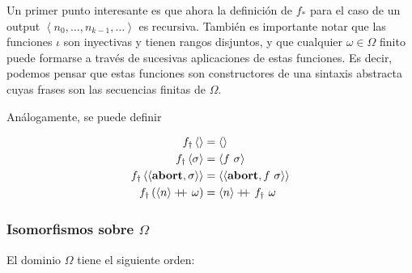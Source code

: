 \documentclass[a4paper, 12pt]{article}
\newcommand\doubleplus{+\kern-1.3ex+\kern0.8ex}
\begin{document}
Un primer punto interesante es que ahora la definición de $f_*$ para el caso de un
output $\left<n_0, \ldots, n_{k-1}, \ldots\right>$ es recursiva. También es
importante notar que las funciones $\iota$ son inyectivas y tienen rangos
disjuntos, y que cualquier $\omega \in \Omega$ finito puede formarse a través de
sucesivas aplicaciones de estas funciones. Es decir, podemos pensar que estas
funciones son constructores de una sintaxis abstracta cuyas frases son las
secuencias finitas de $\Omega$.

Análogamente, se puede definir 

\begin{align*}
  f_\dagger\left< \right> &= \left< \right> \\ 
  f_\dagger \left<\sigma \right> &= \left<f ~ \sigma \right> \\ 
  f_\dagger \left<\left<\textbf{abort}, \sigma \right> \right> &=
  \left<\left<\textbf{abort}, f ~\sigma \right> \right> \\ 
  f_\dagger \left( \left<n \right> \doubleplus \omega \right) &= \left<n \right>
  \doubleplus f_\dagger ~ \omega
\end{align*}
\pagebreak
\subsubsection{Isomorfismos sobre $\Omega$}

El dominio $\Omega$ tiene el siguiente orden:

~
\begin{figure}[!h]
\centering
{}
\end{figure} 
 
\end{document}
